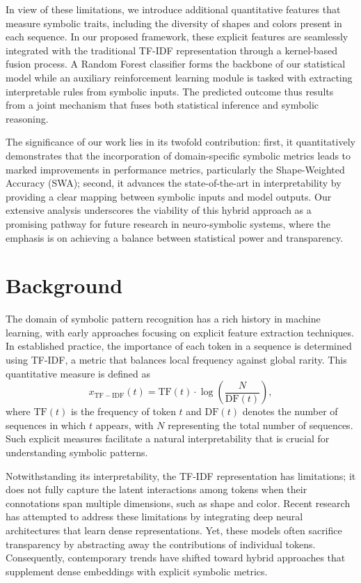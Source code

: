 \documentclass{article}
\begin{document}
In view of these limitations, we introduce additional quantitative features that measure symbolic traits, including the diversity of shapes and colors present in each sequence. In our proposed framework, these explicit features are seamlessly integrated with the traditional TF-IDF representation through a kernel-based fusion process. A Random Forest classifier forms the backbone of our statistical model while an auxiliary reinforcement learning module is tasked with extracting interpretable rules from symbolic inputs. The predicted outcome thus results from a joint mechanism that fuses both statistical inference and symbolic reasoning.

The significance of our work lies in its twofold contribution: first, it quantitatively demonstrates that the incorporation of domain-specific symbolic metrics leads to marked improvements in performance metrics, particularly the Shape-Weighted Accuracy (SWA); second, it advances the state-of-the-art in interpretability by providing a clear mapping between symbolic inputs and model outputs. Our extensive analysis underscores the viability of this hybrid approach as a promising pathway for future research in neuro-symbolic systems, where the emphasis is on achieving a balance between statistical power and transparency.

\section{Background}
The domain of symbolic pattern recognition has a rich history in machine learning, with early approaches focusing on explicit feature extraction techniques. In established practice, the importance of each token in a sequence is determined using TF-IDF, a metric that balances local frequency against global rarity. This quantitative measure is defined as
\[
x_{\mathrm{TF-IDF}}(t) = \mathrm{TF}(t) \cdot \log\left(\frac{N}{\mathrm{DF}(t)}\right),
\]
where \(\mathrm{TF}(t)\) is the frequency of token \(t\) and \(\mathrm{DF}(t)\) denotes the number of sequences in which \(t\) appears, with \(N\) representing the total number of sequences. Such explicit measures facilitate a natural interpretability that is crucial for understanding symbolic patterns.

Notwithstanding its interpretability, the TF-IDF representation has limitations; it does not fully capture the latent interactions among tokens when their connotations span multiple dimensions, such as shape and color. Recent research has attempted to address these limitations by integrating deep neural architectures that learn dense representations. Yet, these models often sacrifice transparency by abstracting away the contributions of individual tokens. Consequently, contemporary trends have shifted toward hybrid approaches that supplement dense embeddings with explicit symbolic metrics.
\end{document}
